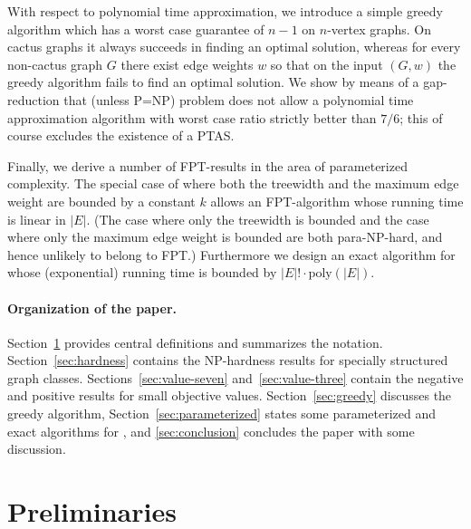 With respect to polynomial time approximation, we introduce a simple greedy algorithm
which has a worst case guarantee of $n-1$ on $n$-vertex graphs.
On cactus graphs it always succeeds in finding an optimal solution, whereas for every 
non-cactus graph $G$ there exist edge weights $w$ so that on the input $(G,w)$ the 
greedy algorithm fails to find an optimal solution.
We show by means of a gap-reduction that (unless P=NP) problem {\xxxNTP} does not
allow a polynomial time approximation algorithm with worst case ratio strictly better
than $7/6$; this of course excludes the existence of a PTAS.

Finally, we derive a number of FPT-results in the area of parameterized complexity.
The special case of {\xxxNTP} where both the treewidth and the maximum edge weight are 
bounded by a constant $k$ allows an FPT-algorithm whose running time is linear in $|E|$.
(The case where only the treewidth is bounded and the case where only the maximum 
edge weight is bounded are both para-NP-hard, and hence unlikely to belong to FPT.)
Furthermore we design an exact algorithm for {\xxxNTP} whose (exponential) 
running time is bounded by $|E|!\cdot\text{poly}(|E|)$.

\paragraph{Organization of the paper.}
Section~\ref{sec:notation} provides central definitions and summarizes the notation.
Section~\ref{sec:hardness} contains the NP-hardness results for specially structured graph classes. 
Sections~\ref{sec:value-seven} and~\ref{sec:value-three} contain the negative and positive results 
for small objective values. 
Section~\ref{sec:greedy} discusses the greedy algorithm, 
Section~\ref{sec:parameterized} states some parameterized and exact algorithms for {\xxxNTP}, and
\cref{sec:conclusion} concludes the paper with some discussion.


\section{Preliminaries}
\label{sec:notation}

